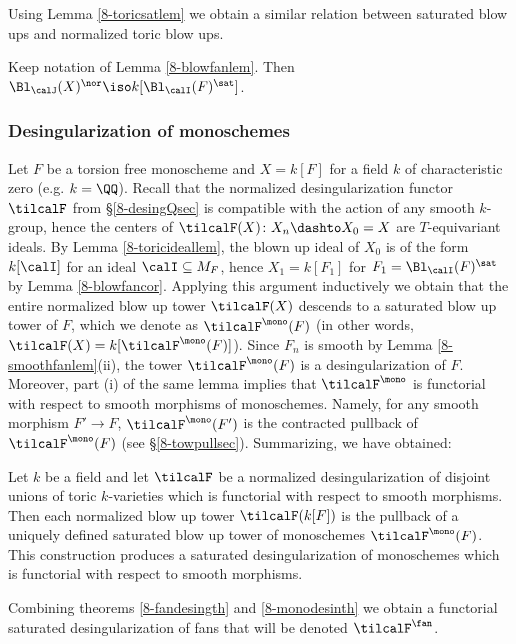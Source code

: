 \documentclass[10pt]{../fichiers-configuration-latex/smfart}
\begin{document}
Using Lemma \ref{8-toricsatlem} we obtain a similar relation between
saturated blow ups and normalized toric blow ups.

\begin{corollary2}\label{8-blowfancor} Keep notation of
Lemma \ref{8-blowfanlem}. Then $\Bl_\calJ(X)^\nor\iso
k[\Bl_\calI(F)^\sat]$.  \end{corollary2}

\subsubsection{Desingularization of
monoschemes}\label{8-desingmonosec} Let $F$ be a torsion free
monoscheme and $X=k[F]$ for a field $k$ of characteristic zero
(e.g. $k=\QQ$). Recall that the normalized desingularization functor
$\tilcalF$ from \S\ref{8-desingQsec} is compatible with the action
of any smooth $k$-group, hence the centers of $\tilcalF(X)\colon
X_n\dashto X_0=X$ are $T$-equivariant ideals. By Lemma
\ref{8-toricideallem}, the blown up ideal of $X_0$ is of the form
$k[\calI]$ for an ideal $\calI\subseteq{M}_F$, hence $X_1=k[F_1]$
for $F_1=\Bl_\calI(F)^\sat$ by Lemma \ref{8-blowfancor}. Applying
this argument inductively we obtain that the entire normalized
blow up tower $\tilcalF(X)$ descends to a saturated blow up tower
of $F$, which we denote as $\tilcalF^\mono(F)$ (in other words,
$\tilcalF(X)=k[\tilcalF^\mono(F)]$). Since $F_n$ is smooth by
Lemma \ref{8-smoothfanlem}(ii), the tower $\tilcalF^\mono(F)$
is a desingularization of $F$. Moreover, part (i) of the same
lemma implies that $\tilcalF^\mono$ is functorial with respect to
smooth morphisms of monoschemes. Namely, for any smooth morphism
$F'\to F$, $\tilcalF^\mono(F')$ is the contracted pullback of
$\tilcalF^\mono(F)$ (see \S\ref{8-towpullsec}). Summarizing, we
have obtained:

\begin{theorem2}\label{8-monodesinth} Let $k$ be a field and let
$\tilcalF$ be a normalized desingularization of disjoint unions
of toric $k$-varieties which is functorial with respect to smooth
morphisms. Then each normalized blow up tower $\tilcalF(k[F])$
is the pullback of a uniquely defined saturated blow up tower
of monoschemes $\tilcalF^\mono(F)$. This construction produces a
saturated desingularization of monoschemes which is functorial with
respect to smooth morphisms.  \end{theorem2}

Combining theorems \ref{8-fandesingth} and \ref{8-monodesinth}
we obtain a functorial saturated desingularization of fans that
will be denoted $\tilcalF^\fan$.
\end{document}
